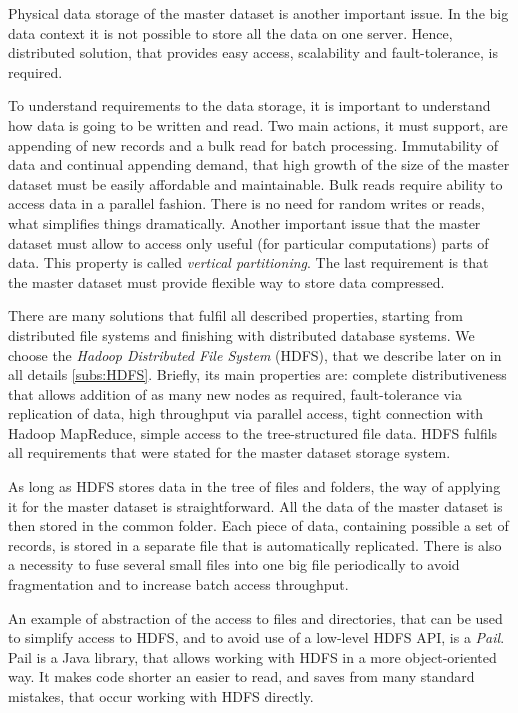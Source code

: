 Physical data storage of the master dataset is another important issue.
In the big data context it is not possible to store all the data on one server.
Hence, distributed solution, that provides easy access, scalability and fault-tolerance, is required. 

To understand requirements to the data storage, it is important to understand how data is going to be written and read.
Two main actions, it must support, are appending of new records and a bulk read for batch processing.
Immutability of data and continual appending demand, that high growth of the size of the master dataset must be easily affordable and maintainable.
Bulk reads require ability to access data in a parallel fashion.
There is no need for random writes or reads, what simplifies things dramatically.
Another important issue that the master dataset must allow to access only useful (for particular computations) parts of data.
This property is called \textit{vertical partitioning}.
The last requirement is that the master dataset must provide flexible way to store data compressed.

There are many solutions that fulfil all described properties, starting from distributed file systems and finishing with distributed database systems. 
We choose the \textit{Hadoop Distributed File System} (HDFS), that we describe later on in all details \ref{subs:HDFS}.
Briefly, its main properties are: complete distributiveness that allows addition of as many new nodes as required, fault-tolerance via replication of data, high throughput via parallel access, tight connection with Hadoop MapReduce, simple access to the tree-structured file data.
HDFS fulfils all requirements that were stated for the master dataset storage system.

As long as HDFS stores data in the tree of files and folders, the way of applying it for the master dataset is straightforward.
All the data of the master dataset is then stored in the common folder.
Each piece of data, containing possible a set of records, is stored in a separate file that is automatically replicated.
There is also a necessity to fuse several small files into one big file periodically to avoid fragmentation and to increase batch access throughput.

An example of abstraction of the access to files and directories, that can be used to simplify access to HDFS, and to avoid use of a low-level HDFS API, is a \textit{Pail}.
Pail is a Java library, that allows working with HDFS in a more object-oriented way.
It makes code shorter an easier to read, and saves from many standard mistakes, that occur working with HDFS directly.

